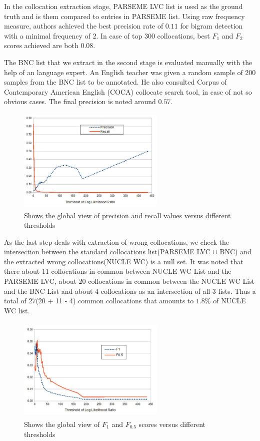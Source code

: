 \documentclass[11pt,a4paper]{article}
\begin{document}
In the collocation extraction stage, PARSEME LVC list is used as the ground truth and is them compared to entries in PARSEME list. Using raw frequency measure, authors achieved the best precision rate of $0.11$ for bigram detection with a minimal frequency of $2$. In case of top 300 collocations, best $F_1$ and $F_2$ scores achieved are both $0.08$.

The BNC list that we extract in the second stage is evaluated manually with the help of an language expert. An English teacher was given a random sample of 200 samples from the BNC list to be annotated. He also consulted Corpus of Contemporary American English (COCA) collocate search tool, in case of not so obvious cases. The final precision is noted around $0.57$.

\begin{figure}[H]
  \includegraphics[width=7cm, height=5cm]{gfx/c_result_1.png}
  \caption{Shows the global view of precision and recall values versus different thresholds}
  \label{fig:c_result_1}
\end{figure}

As the last step deals with extraction of wrong collocations, we check the intersection between the standard collocations list(PARSEME LVC $\cup$ BNC) and the extracted wrong collocations(NUCLE WC) is a null set. It was noted that there about 11 collocations in common between NUCLE WC List and the PARSEME LVC, about 20 collocations in common between the NUCLE WC List and the BNC List and about 4 collocations as an intersection of all 3 lists. 
Thus a total of 27(20 + 11 - 4) common collocations that amounts to $1.8\%$ of NUCLE WC list.

\begin{figure}[H]
  \includegraphics[width=7cm, height=5cm]{gfx/c_result_2.png}
  \caption{Shows the global view of $F_{1}$ and $F_{0.5}$ scores versus different thresholds}
  \label{fig:c_result_2}
\end{figure}
\end{document}
